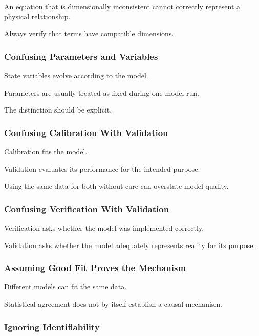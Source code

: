 An equation that is dimensionally inconsistent cannot correctly represent a
physical relationship.

Always verify that terms have compatible dimensions.

\subsubsection{Confusing Parameters and Variables}

State variables evolve according to the model.

Parameters are usually treated as fixed during one model run.

The distinction should be explicit.

\subsubsection{Confusing Calibration With Validation}

Calibration fits the model.

Validation evaluates its performance for the intended purpose.

Using the same data for both without care can overstate model quality.

\subsubsection{Confusing Verification With Validation}

Verification asks whether the model was implemented correctly.

Validation asks whether the model adequately represents reality for its
purpose.

\subsubsection{Assuming Good Fit Proves the Mechanism}

Different models can fit the same data.

Statistical agreement does not by itself establish a causal mechanism.

\subsubsection{Ignoring Identifiability}

